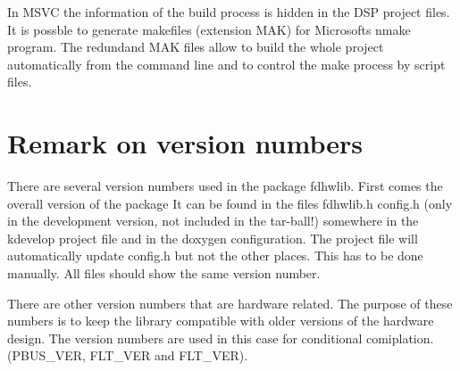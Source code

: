 In M\-S\-V\-C the information of the build process is hidden in the D\-S\-P project files. It is possble to generate makefiles (extension M\-A\-K) for Microsofts nmake program. The redundand M\-A\-K files allow to build the whole project automatically from the command line and to control the make process by script files.\hypertarget{index_fdhwlib_version}{}\section{Remark on version numbers}\label{index_fdhwlib_version}
\begin{DoxyVerb}There are several version numbers used in the package
fdhwlib. First comes the overall version of the package
It can be found in the files fdhwlib.h config.h (only in the
development version, not included in the tar-ball!) somewhere
in the kdevelop project file and in the doxygen configuration.
The project file will automatically update config.h but not
the other places. This has to be done manually. All files
should show the same version number.

There are other version numbers that are hardware related.
The purpose of these numbers is to keep the library compatible
with older versions of the hardware design. The version numbers
are used in this case for conditional comiplation.
(PBUS_VER, FLT_VER and FLT_VER).\end{DoxyVerb}
 